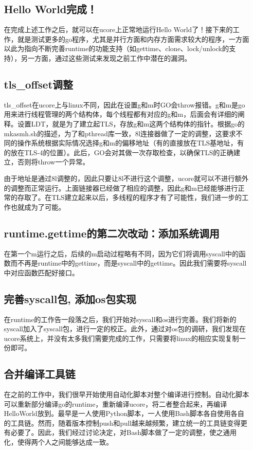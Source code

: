 \documentclass{article}
\begin{document}
\subsection{Hello World完成！}
在完成上述工作之后，就可以在ucore上正常地运行Hello World了！接下来的工作，就是测试更多的go程序，尤其是并行方面和内存方面需求较大的程序，一方面以此为指向不断完善runtime的功能支持（如gettime、clone、lock/unlock的支持），另一方面，通过这些测试来发现之前工作中潜在的漏洞。

\subsection{tls\_offset调整}
tls\_offset在ucore上与linux不同，因此在设置g和m时GO会throw报错。g和m是go用来进行线程管理的两个结构体，每个线程都有对应的g和m，后面会有详细的阐释。设置LDT，就是为了建立起TLS，存放g和m这两个结构体的指针。根据go的mkasmh.sh的描述，为了和pthread库一致，8l连接器做了一定的调整，这要求不同的操作系统根据实际情况选择g和m的偏移地址（有的直接放在TLS基地址，有的放在TLS-4的位置）。此后，GO会对其做一次存取检查，以确保TLS的正确建立，否则将throw一个异常。

由于地址是通过8l调整的，因此只要让8l不进行这个调整，ucore就可以不进行额外的调整而正常运行。上面链接器已经做了相应的调整，因此g和m已经能够进行正常的存取了。在TLS建立起来以后，多线程的程序才有了可能性，我们进一步的工作也就成为了可能。

\subsection{runtime.gettime的第二次改动：添加系统调用}
在第一个m运行之后，后续的m启动过程略有不同，因为它们将调用syscall中的函数而不再是runtime中的gettime，而是syscall中的gettime。因此我们需要将syscall中对应函数匹配好接口。

\subsection{完善syscall包, 添加os包实现}
在runtime的工作告一段落之后，我们开始对syscall和os进行完善。我们将新的syscall加入了syscall包，进行一定的校正。此外，通过对os包的调研，我们发现在ucore系统上，并没有太多我们需要完成的工作，只需要将linux的相应实现复制一份即可。

\subsection{合并编译工具链}
在之前的工作中，我们很早开始使用自动化脚本对整个编译进行控制。自动化脚本可以重新部分编译go的runtime，重新编译ucore，将二者整合起来，再编译HelloWorld放到。最早是一人使用Python脚本，一人使用Bash脚本各自使用各自的工具链。然而，随着版本控制push和pull越来越频繁，建立统一的工具链变得更有必要了。因此，我们经过讨论决定，对Bash脚本做了一定的调整，使之通用化，使得两个人之间能够达成一致。
\end{document}
